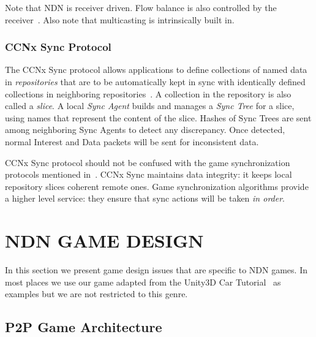 \documentclass{sigchi}
\begin{document}
Note that NDN is receiver driven. Flow balance is also controlled by the receiver~\cite{Zact}. Also note that multicasting is intrinsically built in.

\subsubsection{CCNx Sync Protocol}
\label{ccnsync}

The CCNx Sync protocol allows applications to define collections of named data in \emph{repositories} that are to be automatically kept in sync with identically defined collections in neighboring repositories~\cite{CCNxSync}. A collection in the repository is also called a \emph{slice}. A local \emph{Sync Agent} builds and manages a \emph{Sync Tree} for a slice, using names that represent the content of the slice. Hashes of Sync Trees are sent among neighboring Sync Agents to detect any discrepancy. Once detected, normal Interest and Data packets will be sent for inconsistent data.

CCNx Sync protocol should not be confused with the game synchronization protocols mentioned in~. CCNx Sync maintains data integrity: it keeps local repository slices coherent remote ones. Game synchronization algorithms provide a higher level service: they ensure that sync actions will be taken \emph{in order}.



\section{NDN GAME DESIGN}
\label{gamedesign}


In this section we present game design issues that are specific to NDN games. In most places we use our game adapted from the Unity3D Car Tutorial~\cite{UnityCar} as examples but we are not restricted to this genre.


\subsection{P2P Game Architecture}
\end{document}
